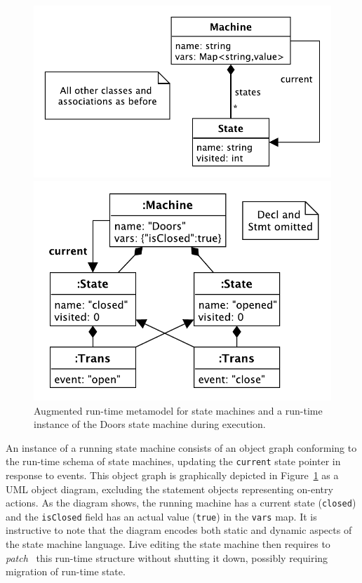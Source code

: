 \documentclass[english,submission]{programming}
\begin{document}
\begin{figure}[t]
  \centering
\begin{minipage}{0.5\textwidth}
\includegraphics[width=\textwidth]{figures/runtime-model.pdf}
\end{minipage}
\hspace*{2pt}
\vline
\begin{minipage}{0.4\textwidth}  
\includegraphics[width=\textwidth]{figures/doorsmachine.pdf}
\end{minipage}
\caption{Augmented run-time metamodel for state machines and a run-time instance of the Doors state machine during execution.}
\label{FIG:doorsRuntime}
\end{figure}


An instance of a running state machine consists of an object graph conforming to the run-time schema of state machines, updating the \lstinline{current} state pointer in response to events. This object graph is graphically depicted in Figure~\ref{FIG:doorsRuntime} as a UML object diagram, excluding the statement objects representing on-entry actions. As the diagram shows, the running machine has a current state (\lstinline{closed}) and the \lstinline{isClosed} field has an actual value (\lstinline{true}) in the \lstinline{vars} map. It is instructive to note that the diagram encodes both static and dynamic aspects of the state machine language. Live editing the state machine then requires to \textit{patch}~\cite{SemanticDeltas} this run-time structure without shutting it down, possibly requiring migration of run-time state.
\end{document}
